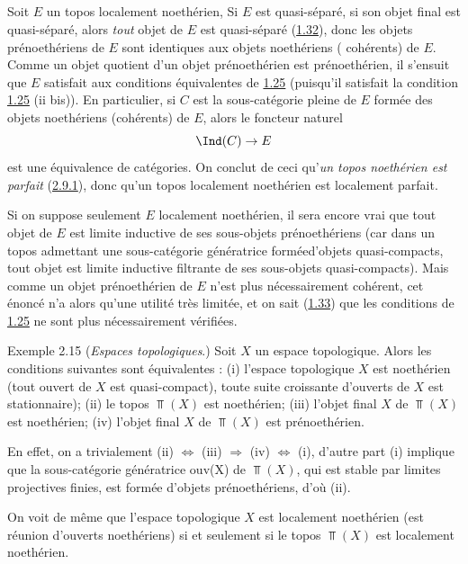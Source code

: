 \subsection{}
Soit $E$ un topos localement noethérien, Si $E$ est quasi-séparé,
\ie si son objet final est quasi-séparé, alors \emph{tout} objet de
$E$ est quasi-séparé (\hyperref[VI.subsec1.32]{1.32}), donc les objets
prénoethériens de $E$ sont identiques aux objets noethériens (\ie
cohérents) de $E$. Comme un objet quotient d'un objet prénoethérien
est prénoethérien, il s'ensuit que $E$ satisfait aux conditions
équivalentes de \hyperref[VI.cor1.25]{1.25} (puisqu'il satisfait la condition
\hyperref[VI.cor1.25]{1.25} (ii bis)). En particulier, si $C$ est la
sous-catégorie pleine de $E$ formée des objets noethériens
(cohérents) de $E$, alors le foncteur naturel
$$
\Ind(C) \to E
$$
est une équivalence de catégories. On conclut de ceci qu'\emph{un topos
noethérien est parfait} (\hyperref[VI.def2.9.1]{2.9.1}), donc qu'un topos localement
noethérien est localement parfait.

Si on suppose seulement $E$ localement noethérien, il sera encore
vrai que tout objet de $E$ est limite inductive de ses sous-objets
prénoethériens (car dans un topos admettant une sous-catégorie
génératrice formée\pageoriginale d'objets quasi-compacts, tout objet
est limite inductive filtrante de ses sous-objets quasi-compacts).
Mais comme un objet prénoethérien de $E$ n'est plus nécessairement
cohérent, cet énoncé n'a alors qu'une utilité très limitée, et on
sait (\hyperref[VI.exem1.33]{1.33}) que les conditions de \hyperref[VI.cor1.25]{1.25} ne
sont plus nécessairement vérifiées.

\begin{enonce*}[remark]{Exemple 2.15}
(\emph{Espaces topologiques}.) Soit $X$ un espace topologique. Alors
les conditions suivantes sont équivalentes : (i) l'espace
topologique $X$ est noethérien (\ie tout ouvert de $X$ est
quasi-compact), \ie toute suite croissante d'ouverts de $X$ est
stationnaire); (ii) le topos $\Top(X)$ est noethérien; (iii) l'objet
final $X$ de $\Top(X)$ est noethérien; (iv) l'objet final $X$ de
$\Top(X)$ est prénoethérien.

En effet, on a trivialement (ii) $\Leftrightarrow$ (iii) $\Rightarrow$
(iv) $\Leftrightarrow$ (i), d'autre part (i) implique que la
sous-catégorie génératrice ouv(X) de $\Top(X)$, qui est stable par
limites projectives finies, est formée d'objets prénoethériens, d'où (ii).

On voit de même que l'espace topologique $X$ est localement
noethérien (\ie est réunion d'ouverts noethériens) si et seulement
si le topos $\Top(X)$ est localement noethérien.
\end{enonce*}

